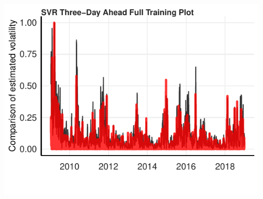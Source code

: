 \documentclass[11pt,preprint, authoryear]{elsarticle}
\let\origfigure\figure
\let\endorigfigure\endfigure
\renewenvironment{figure}[1][2] {
    \expandafter\origfigure\expandafter[H]
} {
    \endorigfigure
}
\numberwithin{equation}{section}
\numberwithin{figure}{section}
\numberwithin{table}{section}
\begin{document}
\begin{figure}[H]

{\centering \includegraphics{Essay_files/figure-latex/plot_10-1} 

}

\caption{SVR Three-Day Ahead Full Training Forecast}\label{fig:plot_10}
\end{figure}


\end{document}
